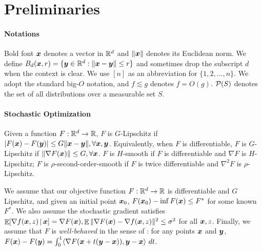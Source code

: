 \section{Preliminaries}
\label{sec:Exp-O2NC_pre}

\paragraph{Notations}
Bold font ${\boldsymbol{x}}$ denotes a vector in $\mathbb R^d$ and $\|{\boldsymbol{x}}\|$ denotes its Euclidean norm. We define $B_d({\boldsymbol{x}},r)=\{{\boldsymbol{y}}\in\mathbb R^d:\|{\boldsymbol{x}}-{\boldsymbol{y}}\|\le r\}$ and sometimes drop the subscript $d$ when the context is clear. We use $[n]$ as an abbreviation for $\{1,2,\ldots,n\}$. We adopt the standard big-$O$ notation, and $f\lesssim g$ denotes $f=O(g)$. ${\cal P}(S)$ denotes the set of all distributions over a measurable set $S$.


\paragraph{Stochastic Optimization}
Given a function $F:\mathbb R^d\to\mathbb R$, $F$ is $G$-Lipschitz if $|F({\boldsymbol{x}})-F({\boldsymbol{y}})| \le G\|{\boldsymbol{x}}-{\boldsymbol{y}}\|, \forall {\boldsymbol{x}},{\boldsymbol{y}}$. Equivalently, when $F$ is differentiable, $F$ is $G$-Lipschitz if $\|\nabla F({\boldsymbol{x}})\|\le G, \forall {\boldsymbol{x}}$. $F$ is $H$-smooth if $F$ is differentiable and $\nabla F$ is $H$-Lipschitz; $F$ is $\rho$-second-order-smooth if $F$ is twice differentiable and $\nabla^2 F$ is $\rho$-Lipschitz.

\begin{assumption}
\label{as:Exp-O2NC:optimization}
We assume that our objective function $F:\mathbb R^d\to \mathbb R$ is differentiable and $G$ Lipschitz, and given an initial point ${\boldsymbol{x}}_0$, $F({\boldsymbol{x}}_0)-\inf F({\boldsymbol{x}}) \le F^*$ for some known $F^*$. We also assume the stochastic gradient satisfies $\mathop{\mathbb{E}}[\nabla f({\boldsymbol{x}},z)\,|\,{\boldsymbol{x}}]=\nabla F({\boldsymbol{x}}), \mathop{\mathbb{E}}\|\nabla F({\boldsymbol{x}})-\nabla f({\boldsymbol{x}},z)\|^2 \le \sigma^2$ for all ${\boldsymbol{x}},z$. Finally, we assume that $F$ is \emph{well-behaved} in the sense of \cite{cutkosky2023optimal}: for any points ${\boldsymbol{x}}$ and ${\boldsymbol{y}}$, $F({\boldsymbol{x}})-F({\boldsymbol{y}}) = \int_0^1 \langle \nabla F({\boldsymbol{x}}+t({\boldsymbol{y}}-{\boldsymbol{x}})), {\boldsymbol{y}}-{\boldsymbol{x}}\rangle \ dt$.
\end{assumption}


